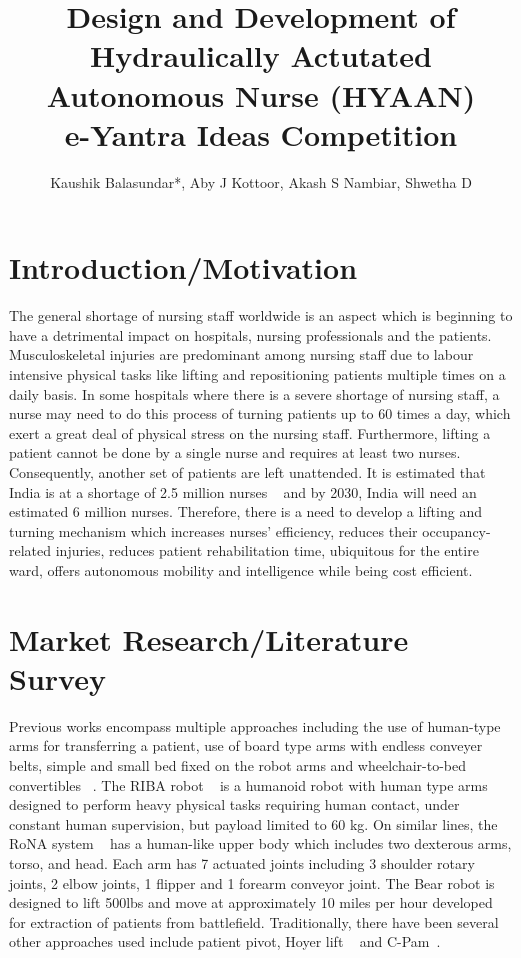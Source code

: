 \documentclass[12]{article}
\title{%
	Design and Development of \\
	Hydraulically Actutated Autonomous Nurse (HYAAN)
	\large \\e-Yantra Ideas Competition\\
	}
\author{Kaushik Balasundar*, Aby J Kottoor, Akash S Nambiar, Shwetha D}
\begin{document}
	
	\maketitle
	\newpage
	\setlength{\parindent}{1cm} %
	
	\section{Introduction/Motivation}
	The general shortage of nursing staff worldwide is an aspect which is beginning to have a detrimental impact on hospitals, nursing professionals and the patients. Musculoskeletal injuries are predominant among nursing staff due to labour intensive physical tasks like lifting and repositioning patients multiple times on a daily basis. In some hospitals where there is a severe shortage of nursing staff, a nurse may need to do this process of turning patients up to 60 times a day, which exert a great deal of physical stress on the nursing staff. Furthermore, lifting a patient cannot be done by a single nurse and requires at least two nurses. Consequently, another set of patients are left unattended. It is estimated that India is at a shortage of 2.5 million nurses ~\cite{etimes} and by 2030, India will need an estimated 6 million nurses.  Therefore, there is a need to develop a lifting and turning mechanism which increases nurses’ efficiency, reduces their occupancy-related injuries, reduces patient rehabilitation time, ubiquitous for the entire ward, offers autonomous mobility and intelligence while being cost efficient. 
	
	\section{Market Research/Literature Survey}
	Previous works encompass multiple approaches including the use of human-type arms for transferring a patient, use of board type arms with endless conveyer belts, simple and small bed ﬁxed on the robot arms and wheelchair-to-bed convertibles ~\cite{Bostelman}. The RIBA robot ~\cite{Mukai} is a humanoid robot with human type arms designed to perform heavy physical tasks requiring human contact, under constant human supervision, but payload limited to 60 kg. On similar lines, the RoNA system ~\cite{Ding} has a human-like upper body which includes two dexterous arms, torso, and head. Each arm has 7 actuated joints including 3 shoulder rotary joints, 2 elbow joints, 1 flipper and 1 forearm conveyor joint. The Bear robot is designed to lift 500lbs and move at approximately 10 miles per hour developed for extraction of patients from battlefield. Traditionally, there have been several other approaches used include patient pivot, Hoyer lift ~\cite{Hindawi} and C-Pam~\cite{Wang}. 
	
\end{document}
